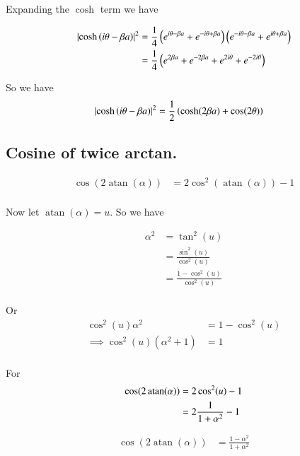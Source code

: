 \documentclass{article}
\DeclareMathOperator{\atan}{atan}
\begin{document}
Expanding the $\cosh$ term we have

\begin{align*}
\left\lvert{\cosh\left( i\theta -\beta a \right)}\right\rvert^2
&=
\frac{1}{4}
\left(
e^{i\theta - \beta a}
+ e^{-i\theta + \beta a}
\right)
\left(
e^{-i\theta - \beta a}
+ e^{i\theta + \beta a}
\right) \\
&=
\frac{1}{4}\left(
e^{2\beta a}
+ e^{-2\beta a}
+e^{2i\theta }
+e^{-2i\theta }
\right) \\
\end{align*}

So we have
\begin{align}\label{eqn:coshSquared}
\left\lvert{\cosh\left( i\theta -\beta a \right)}\right\rvert^2
&=\frac{1}{2}
\left( \cosh(2\beta a) + \cos(2\theta) \right)
\end{align}

\subsection{ Cosine of twice arctan. }

\begin{align*}
\cos(2\atan(\alpha)) 
&= 
2 \cos^2\left( \atan(\alpha) \right) -1 \\
\end{align*}

Now let $\atan(\alpha) = u$.  So we have

\begin{align*}
\alpha^2 
&=
\tan^2(u)  \\
&=
\frac{\sin^2(u)}{\cos^2(u)} \\
&=
\frac{1 -\cos^2(u)}{\cos^2(u)} \\
\end{align*}

Or
\begin{align*}
\cos^2(u) \alpha^2 &= 1 - \cos^2(u) \\
\implies
\cos^2(u) (\alpha^2 +1 ) &= 1 \\
\end{align*}

For 
\begin{align*}
\cos(2\atan(\alpha)) 
&= 
2 \cos^2( u ) -1 \\
&= 
2 \inv{1 + \alpha^2} -1 \\
\end{align*}

\begin{align}\label{eqn:cosineTwiceArcTan}
\cos(2\atan(\alpha)) 
&= 
\frac{1 - \alpha^2}{1 + \alpha^2}
\end{align}
\end{document}

